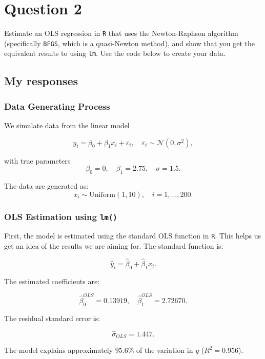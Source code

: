 \documentclass[12pt,letterpaper]{article}
\begin{document}
\vspace{1in}

\section*{Question 2}
\noindent Estimate an OLS regression in \texttt{R} that uses the Newton-Raphson algorithm (specifically \texttt{BFGS}, which is a quasi-Newton method), and show that you get the equivalent results to using \texttt{lm}. Use the code below to create your data.
\vspace{.5cm}
 




\subsection*{My responses}

\subsubsection*{Data Generating Process}

We simulate data from the linear model

\[
y_i = \beta_0 + \beta_1 x_i + \varepsilon_i,
\quad \varepsilon_i \sim \mathcal{N}(0, \sigma^2),
\]

with true parameters
\[
\beta_0 = 0, \quad \beta_1 = 2.75, \quad \sigma = 1.5.
\]

The data are generated as:
\[
x_i \sim \text{Uniform}(1,10), \quad i = 1,\dots,200.
\]

\subsubsection*{OLS Estimation using \texttt{lm()}}

First, the model is estimated using the standard OLS function in \texttt{R}. This helps us get an idea of the results we are aiming for. The standard function is:

\[
\hat{y}_i = \hat{\beta}_0 + \hat{\beta}_1 x_i.
\]

The estimated coefficients are:

\[
\hat{\beta}_0^{OLS} = 0.13919,
\quad
\hat{\beta}_1^{OLS} = 2.72670.
\]

The residual standard error is:

\[
\hat{\sigma}_{OLS} = 1.447.
\]

The model explains approximately $95.6\%$ of the variation in $y$ ($R^2 = 0.956$).
\end{document}
